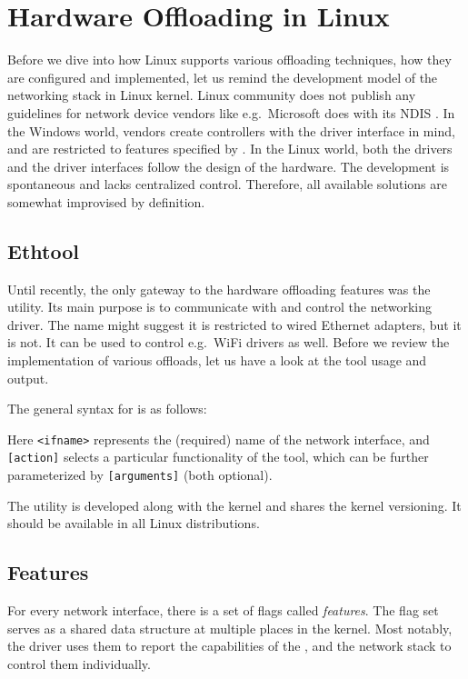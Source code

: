 \chapter{Hardware Offloading in Linux}

Before we dive into how Linux supports various offloading techniques, how they
are configured and implemented, let us remind the development
model of the networking stack in Linux kernel. Linux
community does not publish any guidelines for network device vendors like
e.g.\ Microsoft does with its \acrfull{NDIS} \cite{NDIS}. In the Windows world,
vendors create controllers with the driver interface in mind, and are
restricted to features specified by . In the Linux world, both the
drivers and the driver interfaces follow the design of the hardware. The
development is spontaneous and lacks centralized control. Therefore, all available
solutions are somewhat improvised by definition.

\section{Ethtool}

Until recently, the only gateway to the hardware offloading features was the
 utility. Its main purpose is to communicate with and
control the networking driver. The name might suggest it is restricted to
wired Ethernet adapters, but it is not. It can be used to control e.g.\ WiFi
drivers as well. Before we review the implementation of various offloads, let
us have a look at the tool usage and output.

The general syntax for  is as follows:


Here \texttt{<ifname>} represents the (required) name of the network
interface, and \texttt{[action]} selects a particular functionality of the
tool, which can be further parameterized by \texttt{[arguments]} (both
optional).

The utility is developed along with the kernel and shares the kernel
versioning. It should be available in all Linux distributions.

\section{Features}

For every network interface, there is a set of flags called \emph{features}.
The flag set serves as a shared data structure at multiple places in the
kernel. Most notably, the driver uses them to report the capabilities of the
, and the network stack to control them individually.

